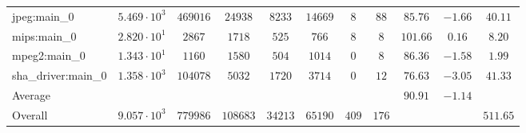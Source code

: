 \begin{tabular}{|l|c|c|c|c|c|c|c|c|c|c|}
jpeg:main\_0            & $ 5.469 \cdot 10^{3} $ & $ 469016 $ & $ 24938  $ & $ 8233  $ & $ 14669 $ & $ 8   $ & $ 88  $ & $ 85.76       $ & $ -1.66   $ & $ 40.11   $ \\
mips:main\_0            & $ 2.820 \cdot 10^{1} $ & $ 2867   $ & $ 1718   $ & $ 525   $ & $ 766   $ & $ 8   $ & $ 8   $ & $ 101.66      $ & $ 0.16    $ & $ 8.20    $ \\
mpeg2:main\_0           & $ 1.343 \cdot 10^{1} $ & $ 1160   $ & $ 1580   $ & $ 504   $ & $ 1014  $ & $ 0   $ & $ 8   $ & $ 86.36       $ & $ -1.58   $ & $ 1.99    $ \\
sha\_driver:main\_0     & $ 1.358 \cdot 10^{3} $ & $ 104078 $ & $ 5032   $ & $ 1720  $ & $ 3714  $ & $ 0   $ & $ 12  $ & $ 76.63       $ & $ -3.05   $ & $ 41.33   $ \\
\hline
Average                 & $                    $ & $        $ & $        $ & $       $ & $       $ & $     $ & $     $ & $ 90.91       $ & $ -1.14   $ & $         $ \\
\hline
Overall                 & $ 9.057 \cdot 10^{3} $ & $ 779986 $ & $ 108683 $ & $ 34213 $ & $ 65190 $ & $ 409 $ & $ 176 $ & $             $ & $         $ & $ 511.65  $ \\
\hline
\end{tabular}
